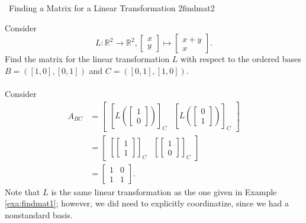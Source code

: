         \begin{example}{\Difficulty\,\Difficulty\,\,Finding a Matrix for a Linear Transformation 2}{findmat2}
            
            Consider
            \begin{equation*}
                L:\mathbb{R}^2\to\mathbb{R}^2, \begin{bmatrix} x \\ y \end{bmatrix} \mapsto \begin{bmatrix} x+y \\ x \end{bmatrix}.
            \end{equation*}
            Find the matrix for the linear transformation \(L\) with respect to the ordered bases \(B=([1,0],[0,1])\) and \(C=([0,1],[1,0])\).
            \\
            \\
            Consider
            \begin{align*}
                A_{BC}&=\begin{bmatrix}
                    \left[L\left(\begin{bmatrix} 1 \\ 0 \end{bmatrix}\right)\right]_C & \left[L\left(\begin{bmatrix} 0 \\ 1 \end{bmatrix}\right)\right]_C
                \end{bmatrix} \\
                &=\begin{bmatrix}
                    \left[\begin{bmatrix} 1 \\ 1 \end{bmatrix}\right]_C & \left[\begin{bmatrix} 1 \\ 0 \end{bmatrix}\right]_C
                \end{bmatrix} \\
                &=\begin{bmatrix}
                    1 & 0 \\
                    1 & 1
                \end{bmatrix}.
            \end{align*}
            Note that \(L\) is the same linear transformation as the one given in Example \ref{exa:findmat1}; however, we did need to explicitly coordinatize, since we had a nonstandard basis.
        \end{example}

